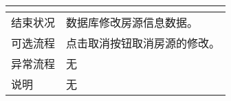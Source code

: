 \begin{table}[htbp]
\begin{tabular}{|l|l|l|l|}
{        }                                                                                                                                                                                                          \\
        \hline
        结束状况                          & \multicolumn{3}{l|}{数据库修改房源信息数据。    }                                                                                                                      \\
        \hline
        可选流程                          & \multicolumn{3}{l|}{点击取消按钮取消房源的修改。 }                                                                                                                     \\
        \hline
        异常流程                          & \multicolumn{3}{l|}{无}                                                                                                                                                \\
        \hline
        说明                              & \multicolumn{3}{l|}{无 }                                                                                                                                               \\
        \hline
    \end{tabular}
\end{table}


